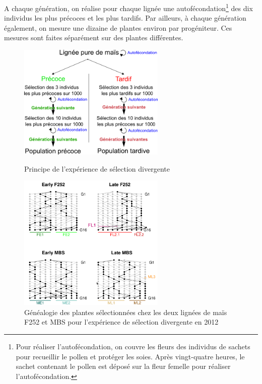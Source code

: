 \documentclass[12pt,a4paper]{article}
\begin{document}
			 			A chaque génération, on réalise pour chaque lignée une autofécondation\footnote{Pour réaliser l'autofécondation, on couvre les fleurs des individus de sachets pour recueillir le pollen et protéger les soies. Après vingt-quatre heures, le sachet contenant le pollen est déposé sur la fleur femelle pour réaliser l'autofécondation.} des dix individus les plus précoces et les plus tardifs. Par ailleurs, à chaque génération également, on mesure une dizaine de plantes environ par progéniteur. Ces mesures sont faites séparément sur des plantes différentes.
			 			
			 			\begin{figure}[h]
			 				
			 				\begin{minipage}[t]{0.45\textwidth}
			 					\centering
			 					\includegraphics[width=7cm]{selec_div.png} %
			 					\caption{Principe de l'expérience de sélection divergente}
			 					\label{selec.div}
			 				\end{minipage}
			 				\quad
			 				\begin{minipage}[t]{0.45\textwidth}
			 					\centering
			 					\includegraphics[width=7cm]{carte_gen.png} %
			 					\caption{Généalogie des plantes sélectionnées chez les deux lignées de maïs F252 et MBS pour l'expérience de sélection divergente en 2012}
			 					\label{carte_gen}
			 					
			 				\end{minipage}
			 					
			 
			 
			 				
			 			\end{figure}
			 			
\end{document}
